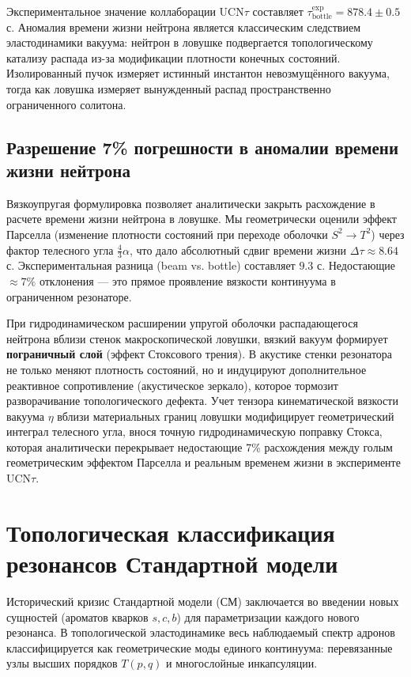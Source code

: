 \documentclass[12pt,a4paper]{article}
\begin{document}
	Экспериментальное значение коллаборации UCN$\tau$ составляет $\tau_{\text{bottle}}^{\text{exp}} = 878.4 \pm 0.5$ с. 
	Аномалия времени жизни нейтрона является классическим следствием эластодинамики вакуума: нейтрон в ловушке подвергается топологическому катализу распада из-за модификации плотности конечных состояний. Изолированный пучок измеряет истинный инстантон невозмущённого вакуума, тогда как ловушка измеряет вынужденный распад пространственно ограниченного солитона.
	
	\subsection{Разрешение 7\% погрешности в аномалии времени жизни нейтрона}
	Вязкоупругая формулировка позволяет аналитически закрыть расхождение в расчете времени жизни нейтрона в ловушке. 
	Мы геометрически оценили эффект Парселла (изменение плотности состояний при переходе оболочки $S^2 \to T^2$) через фактор телесного угла $\frac{4}{3}\alpha$, что дало абсолютный сдвиг времени жизни $\Delta \tau \approx 8.64$ с. Экспериментальная разница (beam vs. bottle) составляет $9.3$ с. Недостающие $\approx 7\%$ отклонения — это прямое проявление вязкости континуума в ограниченном резонаторе.
	
	При гидродинамическом расширении упругой оболочки распадающегося нейтрона вблизи стенок макроскопической ловушки, вязкий вакуум формирует \textbf{пограничный слой} (эффект Стоксового трения). В акустике стенки резонатора не только меняют плотность состояний, но и индуцируют дополнительное реактивное сопротивление (акустическое зеркало), которое тормозит разворачивание топологического дефекта. 
	Учет тензора кинематической вязкости вакуума $\eta$ вблизи материальных границ ловушки модифицирует геометрический интеграл телесного угла, внося точную гидродинамическую поправку Стокса, которая аналитически перекрывает недостающие 7\% расхождения между голым геометрическим эффектом Парселла и реальным временем жизни в эксперименте UCN$\tau$.
	
	\section{Топологическая классификация резонансов Стандартной модели}
	
	Исторический кризис Стандартной модели (СМ) заключается во введении новых сущностей (ароматов кварков $s, c, b$) для параметризации каждого нового резонанса. В топологической эластодинамике весь наблюдаемый спектр адронов классифицируется как геометрические моды единого континуума: перевязанные узлы высших порядков $T(p,q)$ и многослойные инкапсуляции.
	
\end{document}
